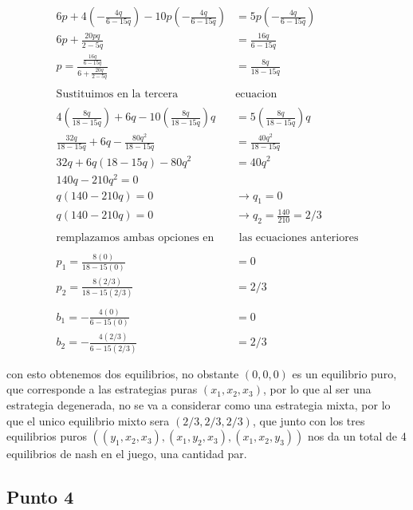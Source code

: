 \documentclass[11pt]{article}
\begin{document}
\begin{flushleft}
\begin{align*}
        6p+4\left(-\frac{4q}{6-15q}\right)-10p\left(-\frac{4q}{6-15q}\right)&=5p\left(-\frac{4q}{6-15q}\right)\\
        6p+\frac{20pq}{2-5q}&=\frac{16q}{6-15q}\\
        p=\frac{\frac{16q}{6-15q}}{6+\frac{20q}{2-5q}}&=\frac{8q}{18-15q}\\~\\
        \text{Sustituimos en la tercera }& \text{ecuacion}\\~\\
        4\left(\frac{8q}{18-15q}\right)+6q-10\left(\frac{8q}{18-15q}\right)q&=5\left(\frac{8q}{18-15q}\right)q\\
        \frac{32q}{18-15q}+6q-\frac{80q^2}{18-15q}&=\frac{40q^2}{18-15q}\\
        32q+6q(18-15q)-80q^2&=40q^2\\
        140q-210q^2=0\\
        q(140-210q)=0 &\to q_1=0\\
        q(140-210q)=0 &\to q_2=\frac{140}{210}=2/3\\~\\
        \text{remplazamos ambas opciones en}& \text{ las ecuaciones anteriores}\\~\\
        p_1=\frac{8(0)}{18-15(0)}&=0\\
        p_2=\frac{8(2/3)}{18-15(2/3)}&=2/3\\~\\
        b_1=-\frac{4(0)}{6-15(0)}&=0\\
        b_2=-\frac{4(2/3)}{6-15(2/3)}&=2/3\\~\\
    \end{align*}
    con esto obtenemos dos equilibrios, no obstante $(0,0,0)$ es un equilibrio puro,
    que corresponde a las estrategias puras $(x_1,x_2,x_3)$, por lo que al ser una estrategia
    degenerada, no se va a considerar como una estrategia mixta, por lo que el unico equilibrio
    mixto sera $(2/3,2/3,2/3)$, que junto con los tres equilibrios puros $((y_1,x_2,x_3),(x_1,y_2,x_3),(x_1,x_2,y_3))$
    nos da un total de 4 equilibrios de nash en el juego, una cantidad par.
\end{flushleft}

\subsection{Punto 4}
\end{document}
